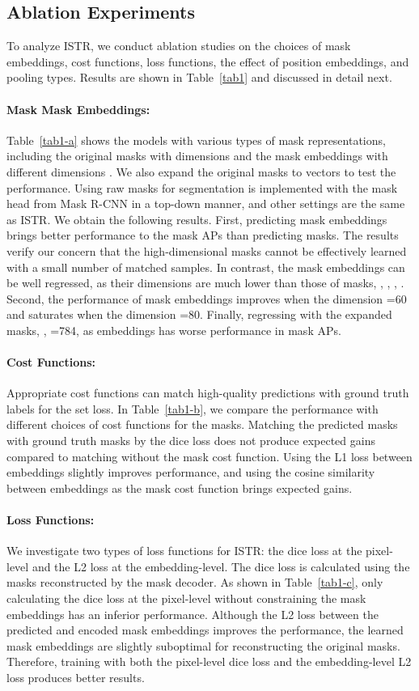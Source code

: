 \documentclass[10pt,twocolumn,letterpaper]{article}
\begin{document}
\subsection{Ablation Experiments}
To analyze ISTR, we conduct ablation studies on the choices of mask embeddings, cost functions, loss functions, the effect of position embeddings, and pooling types.
Results are shown in Table~\ref{tab1} and discussed in detail next.
\paragraph{Mask \vs Mask Embeddings:} Table~\ref{tab1-a} shows the models with various types of mask representations, including the original masks with  dimensions and the mask embeddings with different dimensions .
We also expand the original masks to vectors to test the performance.
Using raw masks for segmentation is implemented with the mask head from Mask R-CNN in a top-down manner, and other settings are the same as ISTR.
We obtain the following results.
First, predicting mask embeddings brings better performance to the mask APs than predicting masks.
The results verify our concern that the high-dimensional masks cannot be effectively learned with a small number of matched samples.
In contrast, the mask embeddings can be well regressed, as their dimensions are much lower than those of masks, \eg, , ,  \vs .
Second, the performance of mask embeddings improves when the dimension =60 and saturates when the dimension =80.
Finally, regressing with the expanded masks, \ie, =784, as embeddings has worse performance in mask APs.
\paragraph{Cost Functions:} Appropriate cost functions can match high-quality predictions with ground truth labels for the set loss.
In Table~\ref{tab1-b}, we compare the performance with different choices of cost functions for the masks.
Matching the predicted masks with ground truth masks by the dice loss does not produce expected gains compared to matching without the mask cost function.
Using the L1 loss between embeddings slightly improves performance, and using the cosine similarity between embeddings as the mask cost function brings expected gains.
\paragraph{Loss Functions:} We investigate two types of loss functions for ISTR: the dice loss at the pixel-level and the L2 loss at the embedding-level.
The dice loss is calculated using the masks reconstructed by the mask decoder.
As shown in Table~\ref{tab1-c}, only calculating the dice loss at the pixel-level without constraining the mask embeddings has an inferior performance.
Although the L2 loss between the predicted and encoded mask embeddings improves the performance, the learned mask embeddings are slightly suboptimal for reconstructing the original masks.
Therefore, training with both the pixel-level dice loss and the embedding-level L2 loss produces better results.
\end{document}
